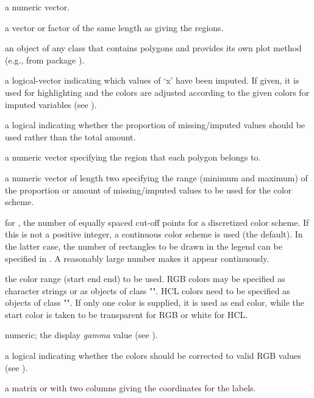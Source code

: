 \begin{Arguments}
\begin{ldescription}
\item[\code{x}] a numeric vector.
\item[\code{region}] a vector or factor of the same length as  giving the 
regions.
\item[\code{map}] an object of any class that contains polygons and provides its own 
plot method (e.g.,  from package ).
\item[\code{imp\_index}] a logical-vector indicating which values of `x' have
been imputed. If given, it is used for highlighting and	the colors are
adjusted according to the given colors for imputed variables (see ).
\item[\code{prop}] a logical indicating whether the proportion of missing/imputed values 
should be used rather than the total amount.
\item[\code{polysRegion}] a numeric vector specifying the region that each polygon 
belongs to.
\item[\code{range}] a numeric vector of length two specifying the range (minimum and 
maximum) of the proportion or amount of missing/imputed values to be used for the 
color scheme.
\item[\code{n}] for , the number of equally spaced cut-off points 
for a discretized color scheme.  If this is not a positive integer, a 
continuous color scheme is used (the default).  In the latter case, the 
number of rectangles to be drawn in the legend can be specified in 
.  A reasonably large number makes it appear 
continuously.
\item[\code{col}] the color range (start end end) to be used.  RGB colors may be 
specified as character strings or as objects of class 
"".  HCL colors need to be specified as 
objects of class "".  If only 
one color is supplied, it is used as end color, while the start color is 
taken to be transparent for RGB or white for HCL.
\item[\code{gamma}] numeric; the display \emph{gamma} value (see 
).
\item[\code{fixup}] a logical indicating whether the colors should be corrected to 
valid RGB values (see ).
\item[\code{coords}] a matrix or  with two columns giving the 
coordinates for the labels.

\end{ldescription}
\end{Arguments}
